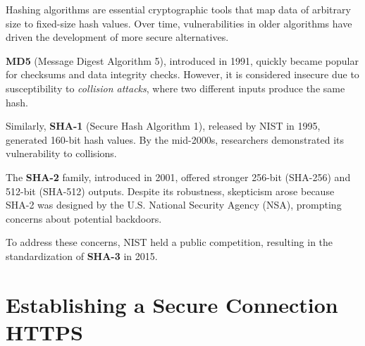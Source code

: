 \newpage 

\begin{Def}

    \label{def:hashing_history}
    Hashing algorithms are essential cryptographic tools that map data of arbitrary size to fixed-size hash values.
    Over time, vulnerabilities in older algorithms have driven the development of more secure alternatives.

    \textbf{MD5} (Message Digest Algorithm 5), introduced in 1991, quickly became popular for checksums
    and data integrity checks. However, it is considered insecure due to susceptibility to
    \textit{collision attacks}, where two different inputs produce the same hash.

    Similarly, \textbf{SHA-1} (Secure Hash Algorithm 1), released by NIST in 1995, generated 160-bit hash values. By the mid-2000s,
    researchers demonstrated its vulnerability to collisions.

    The \textbf{SHA-2} family, introduced in 2001, offered stronger 256-bit (SHA-256) and 512-bit (SHA-512) outputs.
    Despite its robustness, skepticism arose because SHA-2 was designed by the U.S. National Security Agency (NSA), prompting concerns about potential backdoors.

    To address these concerns, NIST held a public competition, resulting in the standardization of \textbf{SHA-3} in 2015.  \hfill \cite{codesigningstore2024hashcomparison}
\end{Def}



\section{Establishing a Secure Connection HTTPS}


